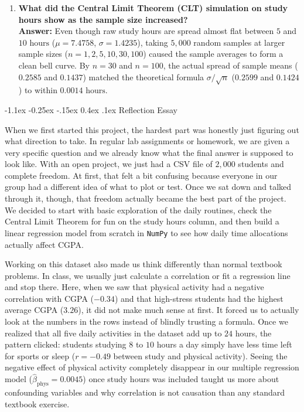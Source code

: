 \documentclass[11pt,a4paper]{article}
\makeatletter
\renewcommand\section{\@startsection {section}{1}{\z@}%
                                   {-1.1ex \@plus -0.25ex \@minus -.15ex}%
                                   {0.4ex \@plus.1ex}%
                                   {\normalfont\large\bfseries\color{accent}}}
\makeatother
\begin{document}
\begin{enumerate}
    \item \textbf{What did the Central Limit Theorem (CLT) simulation on study hours show as the sample size increased?}\\
    \textbf{Answer:} Even though raw study hours are spread almost flat between $5$ and $10\text{ hours}$ ($\mu = 7.4758$, $\sigma = 1.4235$), taking $5,000$ random samples at larger sample sizes ($n = 1, 2, 5, 10, 30, 100$) caused the sample averages to form a clean bell curve. By $n = 30$ and $n = 100$, the actual spread of sample means ($0.2585$ and $0.1437$) matched the theoretical formula $\sigma/\sqrt{n}$ ($0.2599$ and $0.1424$) to within $0.0014\text{ hours}$.
\end{enumerate}

\newpage
\section{Reflection Essay}

\setlength{\parskip}{0.6em}

When we first started this project, the hardest part was honestly just figuring out what direction to take. In regular lab assignments or homework, we are given a very specific question and we already know what the final answer is supposed to look like. With an open project, we just had a CSV file of $2,000$ students and complete freedom. At first, that felt a bit confusing because everyone in our group had a different idea of what to plot or test. Once we sat down and talked through it, though, that freedom actually became the best part of the project. We decided to start with basic exploration of the daily routines, check the Central Limit Theorem for fun on the study hours column, and then build a linear regression model from scratch in \texttt{NumPy} to see how daily time allocations actually affect CGPA.

Working on this dataset also made us think differently than normal textbook problems. In class, we usually just calculate a correlation or fit a regression line and stop there. Here, when we saw that physical activity had a negative correlation with CGPA ($-0.34$) and that high-stress students had the highest average CGPA ($3.26$), it did not make much sense at first. It forced us to actually look at the numbers in the rows instead of blindly trusting a formula. Once we realized that all five daily activities in the dataset add up to $24$ hours, the pattern clicked: students studying $8$ to $10$ hours a day simply have less time left for sports or sleep ($r = -0.49$ between study and physical activity). Seeing the negative effect of physical activity completely disappear in our multiple regression model ($\hat{\beta}_{\text{phys}} = 0.0045$) once study hours was included taught us more about confounding variables and why correlation is not causation than any standard textbook exercise.
\end{document}
